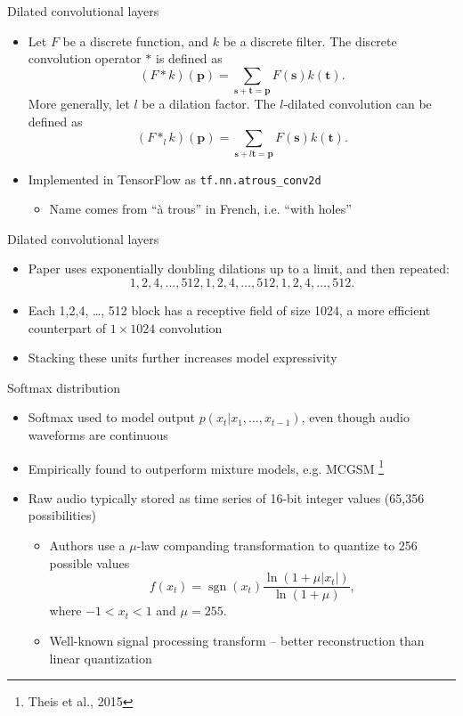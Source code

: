 \documentclass{beamer}
\DeclareMathOperator{\sgn}{sgn}
\begin{document}
  \begin{frame}{Dilated convolutional layers}
    \begin{itemize}
      \item Let $F$ be a discrete function, and $k$ be a discrete filter.  The discrete convolution operator $*$ is defined as
        \[
          (F * k)(\mathbf{p}) = \sum_{\mathbf{s+t=p}} F(\mathbf{s}) k(\mathbf{t}).
        \]
        More generally, let $l$ be a dilation factor.  The $l$-dilated convolution can be defined as
        \[
          (F *_l k)(\mathbf{p}) = \sum_{\mathbf{s}+l\mathbf{t=p}} F(\mathbf{s}) k(\mathbf{t}).
        \]
      \item Implemented in TensorFlow as \texttt{tf.nn.atrous\_conv2d}
        \begin{itemize}
          \item Name comes from ``\`{a} trous'' in French, i.e. ``with holes''
        \end{itemize}
    \end{itemize}
  \end{frame}

  \begin{frame}{Dilated convolutional layers}
    \begin{itemize}
    \item Paper uses exponentially doubling dilations up to a limit, and then repeated:
      \[
        1,2,4,\dots,512,1,2,4,\dots,512,1,2,4,\dots,512.
      \]
     \item Each 1,2,4, \dots, 512 block has a receptive field of size 1024, a more efficient counterpart of $1 \times 1024$ convolution
      \item Stacking these units further increases model expressivity
    \end{itemize}
  \end{frame}

  \begin{frame}{Softmax distribution}
    \begin{itemize}
      \item Softmax used to model output $p(x_t | x_1, \dots, x_{t-1})$, even though audio waveforms are continuous
      \item Empirically found to outperform mixture models, e.g. MCGSM \footnote{Theis et al., 2015}  
      \item Raw audio typically stored as time series of 16-bit integer values (65,356 possibilities)
          \begin{itemize}
            \item Authors use a $\mu$-law companding transformation to quantize to 256 possible values
              \[
                f(x_t) = \sgn(x_t) \frac{\ln(1 + \mu |x_t|)}{\ln (1 + \mu)},
              \]
              where $-1 < x_t < 1$ and $\mu = 255$.
            \item Well-known signal processing transform -- better reconstruction than linear quantization
          \end{itemize}
    \end{itemize}
  \end{frame}
\end{document}
